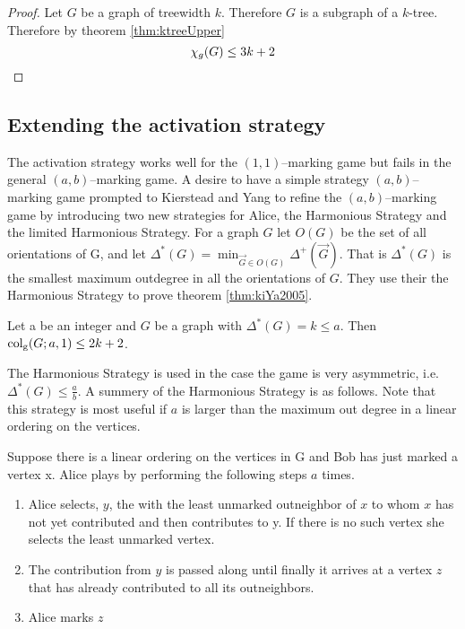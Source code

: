 \begin{proof}
    Let $G$ be a graph of treewidth $k$.
    Therefore $G$ is a subgraph of a $k$-tree. Therefore by theorem \ref{thm:ktreeUpper} \[\chi_g(G) \leq 3k + 2 \qedhere\] 
\end{proof}

\subsection{Extending the activation strategy}

The activation strategy works well for the $(1,1)$--marking game but fails in the general $(a,b)$--marking game. A desire to have a simple strategy $(a,b)$--marking game prompted to Kierstead and Yang to refine the $(a,b)$--marking game by introducing two new strategies for Alice, the Harmonious Strategy and the limited Harmonious Strategy.  For a graph $G$ let $O(G)$ be the set of all orientations of G, and let $\Delta^*(G)=\min_{\vec{G}\in O(G)}\Delta^+(\vec{G})$. That is $\Delta^*(G)$ is the smallest maximum outdegree in all the orientations of $G$. They use their the Harmonious Strategy to prove theorem \ref{thm:kiYa2005}.

\begin{theorem}\label{thm:kiYa2005}
    Let a be an integer and $G$ be a graph with $\Delta^*(G) = k\leq a$. Then
    $\operatorname{col_g}(G;a,1) \leq 2k + 2$.
\end{theorem}

The Harmonious Strategy is used in the case the game is very asymmetric, i.e. $\Delta^*(G)\leq \frac{a}{b}$. A summery of the Harmonious Strategy is as follows. Note that this strategy is most useful if $a$ is larger than the maximum out degree in a linear ordering on the vertices.

Suppose there is a linear ordering on the vertices in G and Bob has just marked a vertex x. Alice plays by performing the following steps $a$ times.    
\begin{enumerate}
    \item  Alice selects, $y$, the with the least unmarked outneighbor of $x$ to whom $x$ has not yet contributed and then contributes to y. If there is no such vertex she selects the least unmarked vertex.
    \item  The contribution from $y$
    is passed along until finally it arrives at a vertex $z$ that has already
    contributed to all its outneighbors.
    \item  Alice marks $z$
\end{enumerate}

